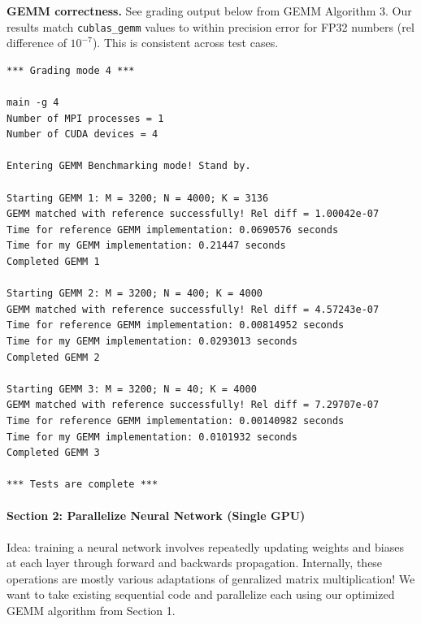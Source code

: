 \documentclass[12pt,letterpaper,twoside]{article}
\begin{document}
\textbf{GEMM correctness.} See grading output below from GEMM Algorithm 3. Our
results match \texttt{cublas\_gemm} values to within precision error for 
FP32 numbers (rel difference of $10^{-7}$). This is consistent across test 
cases. 

\begin{verbatim}
*** Grading mode 4 ***

main -g 4
Number of MPI processes = 1
Number of CUDA devices = 4

Entering GEMM Benchmarking mode! Stand by.

Starting GEMM 1: M = 3200; N = 4000; K = 3136
GEMM matched with reference successfully! Rel diff = 1.00042e-07
Time for reference GEMM implementation: 0.0690576 seconds
Time for my GEMM implementation: 0.21447 seconds
Completed GEMM 1

Starting GEMM 2: M = 3200; N = 400; K = 4000
GEMM matched with reference successfully! Rel diff = 4.57243e-07
Time for reference GEMM implementation: 0.00814952 seconds
Time for my GEMM implementation: 0.0293013 seconds
Completed GEMM 2

Starting GEMM 3: M = 3200; N = 40; K = 4000
GEMM matched with reference successfully! Rel diff = 7.29707e-07
Time for reference GEMM implementation: 0.00140982 seconds
Time for my GEMM implementation: 0.0101932 seconds
Completed GEMM 3

*** Tests are complete ***
\end{verbatim}

\pagebreak
\paragraph{Section 2: Parallelize Neural Network (Single GPU)} Idea: training a neural
network involves repeatedly updating weights and biases at each layer through forward
and backwards propagation. Internally, these operations are mostly various adaptations
of genralized matrix multiplication! We want to take existing sequential code and 
parallelize each using our optimized GEMM algorithm from Section 1.
\end{document}
